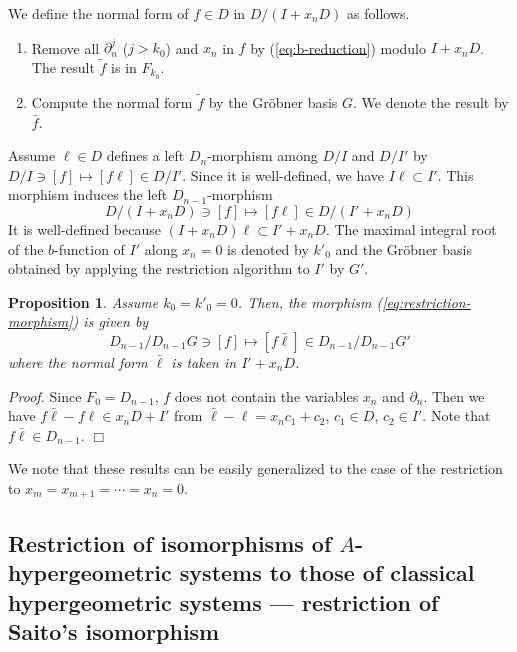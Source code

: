 \documentclass{article}
\def\pd#1{\partial_{#1}}
\def\qed{\hfill $\Box$ \medbreak}
\newtheorem{proposition}{Proposition}
\begin{document}
We define the normal form of $f \in D$ in $D/(I+x_n D)$ as follows.
\begin{enumerate}
\item Remove all $\pd{n}^j$ ($j > k_0$) and $x_n$ in $f$ 
by (\ref{eq:b-reduction}) modulo $I+x_nD$.
 The result ${\tilde f}$ is in $F_{k_0}$. 
\item Compute the normal form ${\tilde f}$ by the Gr\"obner basis $G$.
 We denote the result by ${\bar f}$.
\end{enumerate}

Assume $\ell \in D$ defines a left $D_n$-morphism among $D/I$ and $D/I'$
by $D/I \ni [f] \mapsto [f \ell] \in D/I'$.
Since it is well-defined, we have
$I \ell \subset I'$.
This morphism induces the left $D_{n-1}$-morphism
\begin{equation}  \label{eq:restriction-morphism}
 D/(I+x_n D) \ni [f] \mapsto [f \ell] \in D/(I'+x_nD)
\end{equation}
It is well-defined because
$(I+x_nD) \ell \subset I'+x_n D$.
The maximal integral root of the $b$-function of $I'$ along $x_n=0$
is denoted by $k'_0$ and
the Gr\"obner basis
obtained by applying the restriction algorithm to $I'$
by $G'$.

\begin{proposition}
Assume $k_0=k'_0=0$.
Then, the morphism (\ref{eq:restriction-morphism}) is given by
\begin{equation}
 D_{n-1}/D_{n-1} G \ni [f] \mapsto [f {\bar {\ell}}] \in  D_{n-1}/D_{n-1} G'
\end{equation}
where the normal form ${\bar {\ell}}$ is taken in $I'+x_n D$.
\end{proposition}

{\it Proof\/.}
Since $F_0=D_{n-1}$, $f$ does not contain the variables $x_n$ and $\pd{n}$.
Then we have 
 $f {\bar \ell} - f \ell  \in x_n D + I'$
from ${\bar \ell} - \ell = x_n c_1 + c_2$, $c_1 \in  D$, $c_2 \in I'$.
Note that $f {\bar \ell} \in D_{n-1}$.
\qed

We note that these results can be easily generalized to 
the case of the restriction to $x_m = x_{m+1} = \cdots = x_n = 0$.

\subsection{Restriction of isomorphisms of $A$-hypergeometric systems to those of classical hypergeometric systems --- restriction of Saito's isomorphism}
\end{document}
